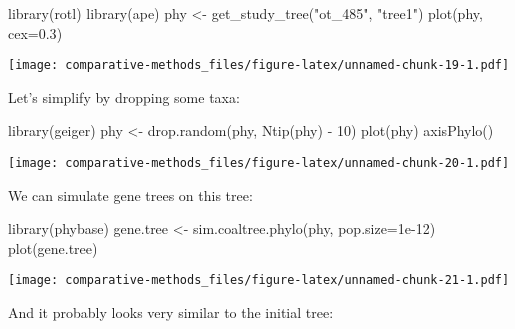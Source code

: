 \documentclass[
]{article}
\newenvironment{Shaded}{\begin{snugshade}}{\end{snugshade}}
\newcommand{\AttributeTok}[1]{\textcolor[rgb]{0.77,0.63,0.00}{#1}}
\newcommand{\DecValTok}[1]{\textcolor[rgb]{0.00,0.00,0.81}{#1}}
\newcommand{\FloatTok}[1]{\textcolor[rgb]{0.00,0.00,0.81}{#1}}
\newcommand{\FunctionTok}[1]{\textcolor[rgb]{0.00,0.00,0.00}{#1}}
\newcommand{\NormalTok}[1]{#1}
\newcommand{\OtherTok}[1]{\textcolor[rgb]{0.56,0.35,0.01}{#1}}
\newcommand{\SpecialCharTok}[1]{\textcolor[rgb]{0.00,0.00,0.00}{#1}}
\newcommand{\StringTok}[1]{\textcolor[rgb]{0.31,0.60,0.02}{#1}}
\begin{document}
\begin{Shaded}
\begin{Highlighting}[]
\FunctionTok{library}\NormalTok{(rotl)}
\FunctionTok{library}\NormalTok{(ape)}
\NormalTok{phy }\OtherTok{\textless{}{-}} \FunctionTok{get\_study\_tree}\NormalTok{(}\StringTok{"ot\_485"}\NormalTok{, }\StringTok{"tree1"}\NormalTok{)}
\FunctionTok{plot}\NormalTok{(phy, }\AttributeTok{cex=}\FloatTok{0.3}\NormalTok{)}
\end{Highlighting}
\end{Shaded}

\texttt{[image: comparative-methods\_files/figure-latex/unnamed-chunk-19-1.pdf]}

Let's simplify by dropping some taxa:

\begin{Shaded}
\begin{Highlighting}[]
\FunctionTok{library}\NormalTok{(geiger)}
\NormalTok{phy }\OtherTok{\textless{}{-}} \FunctionTok{drop.random}\NormalTok{(phy, }\FunctionTok{Ntip}\NormalTok{(phy) }\SpecialCharTok{{-}} \DecValTok{10}\NormalTok{)}
\FunctionTok{plot}\NormalTok{(phy)}
\FunctionTok{axisPhylo}\NormalTok{()}
\end{Highlighting}
\end{Shaded}

\texttt{[image: comparative-methods\_files/figure-latex/unnamed-chunk-20-1.pdf]}

We can simulate gene trees on this tree:

\begin{Shaded}
\begin{Highlighting}[]
\FunctionTok{library}\NormalTok{(phybase)}
\NormalTok{gene.tree }\OtherTok{\textless{}{-}} \FunctionTok{sim.coaltree.phylo}\NormalTok{(phy, }\AttributeTok{pop.size=}\FloatTok{1e{-}12}\NormalTok{)}
\FunctionTok{plot}\NormalTok{(gene.tree)}
\end{Highlighting}
\end{Shaded}

\texttt{[image: comparative-methods\_files/figure-latex/unnamed-chunk-21-1.pdf]}

And it probably looks very similar to the initial tree:

\begin{Shaded}
\end{Shaded}
\end{document}
